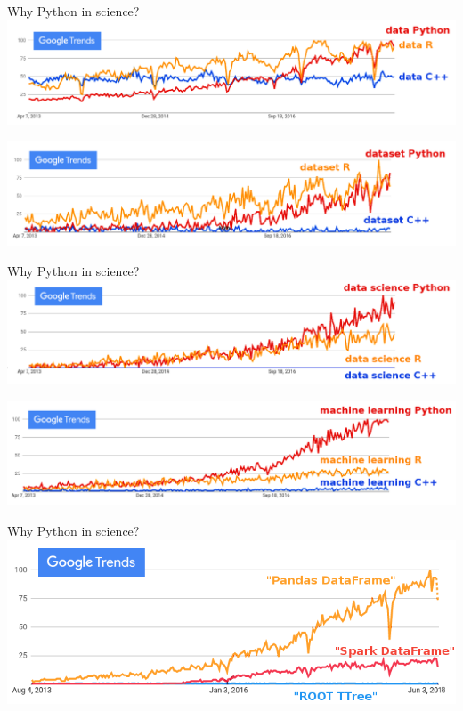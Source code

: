\documentclass[aspectratio=169]{beamer}
\begin{document}
\begin{frame}{Why Python in science?}
\vspace{0.5 cm}
\includegraphics[width=\linewidth]{python-r-cpp-googletrends-data.png}

\vspace{1 cm}
\includegraphics[width=\linewidth]{python-r-cpp-googletrends-dataset.png}
\end{frame}

\begin{frame}{Why Python in science?}
\vspace{0.5 cm}
\includegraphics[width=\linewidth]{python-r-cpp-googletrends-datascience.png}

\vspace{1 cm}
\includegraphics[width=\linewidth]{python-r-cpp-googletrends-machinelearning.png}
\end{frame}

\begin{frame}{Why Python in science?}
\vspace{0.5 cm}
\includegraphics[width=\linewidth]{root-spark-pandas-google-trends.png}
\end{frame}
\end{document}
